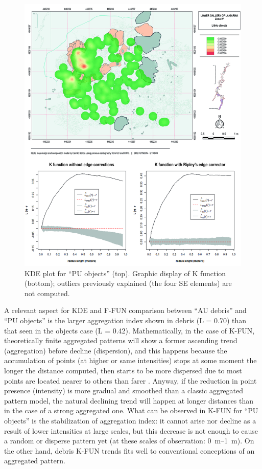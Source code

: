 \begin{figure}
	\includegraphics[width=\linewidth]{figures/garcia_Fig6}
	\centering
	\caption{KDE plot for “PU objects” (top). Graphic display of K function (bottom); outliers previously explained (the four SE elements) are not computed.}
	\label{fig:Garcia_Fig6}
\end{figure}

A relevant aspect for KDE and F-FUN comparison between “AU debris” and “PU objects” is the larger aggregation index shown in debris (L = 0.70) than that seen in the objects case (L = 0.42). Mathematically, in the case of K-FUN, theoretically finite aggregated patterns will show a former ascending trend (aggregation) before decline (dispersion), and this happens because the accumulation of points (at higher or same intensities) stops at some moment the longer the distance computed, then starts to be more dispersed due to most points are located nearer to others than farer \parencite{Maximiano_2008}. Anyway, if the reduction in point presence (intensity) is more gradual and smoothed than a classic aggregated pattern model, the natural declining trend will happen at longer distances than in the case of a strong aggregated one. What can be observed in K-FUN for “PU objects” is the stabilization of aggregation index: it cannot arise nor decline as a result of lower intensities at large scales, but this decrease is not enough to cause a random or disperse pattern yet (at these scales of observation: \SIrange{0}{1}{\metre}). On the other hand, debris K-FUN trends fits well to conventional conceptions of an aggregated pattern. 

